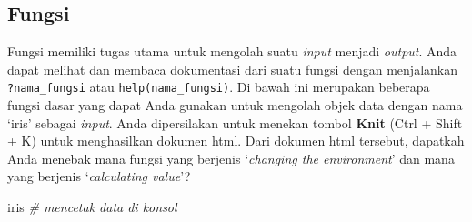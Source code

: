 \documentclass[]{article}
\newenvironment{Shaded}{\begin{snugshade}}{\end{snugshade}}
\newcommand{\CommentTok}[1]{\textcolor[rgb]{0.56,0.35,0.01}{\textit{#1}}}
\newcommand{\NormalTok}[1]{#1}
\begin{document}
\subsection{Fungsi}\label{fungsi}

Fungsi memiliki tugas utama untuk mengolah suatu \emph{input} menjadi
\emph{output}. Anda dapat melihat dan membaca dokumentasi dari suatu
fungsi dengan menjalankan \texttt{?nama\_fungsi} atau
\texttt{help(nama\_fungsi)}. Di bawah ini merupakan beberapa fungsi
dasar yang dapat Anda gunakan untuk mengolah objek data dengan nama
`iris' sebagai \emph{input}. Anda dipersilakan untuk menekan tombol
\textbf{Knit} (Ctrl + Shift + K) untuk menghasilkan dokumen html. Dari
dokumen html tersebut, dapatkah Anda menebak mana fungsi yang berjenis
`\emph{changing the environment}' dan mana yang berjenis
`\emph{calculating value}'?

\begin{Shaded}
\begin{Highlighting}[]
\NormalTok{iris }\CommentTok{# mencetak data di konsol}
\end{Highlighting}
\end{Shaded}
\end{document}
